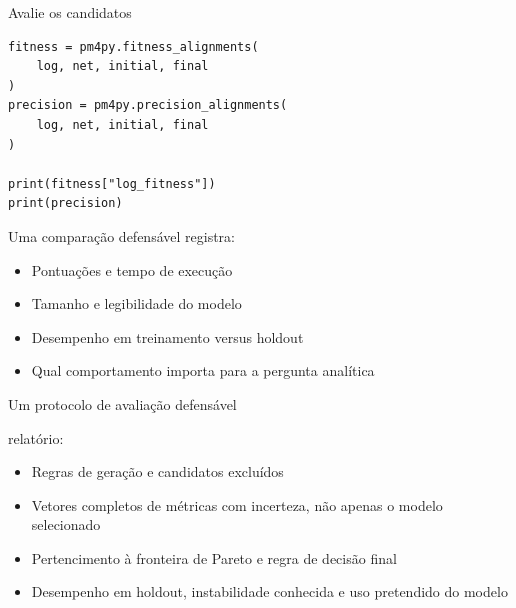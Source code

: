 \documentclass[aspectratio=169,11pt]{beamer}
\begin{document}
\begin{frame}[fragile]{Avalie os candidatos}
\begin{lstlisting}[style=python]
fitness = pm4py.fitness_alignments(
    log, net, initial, final
)
precision = pm4py.precision_alignments(
    log, net, initial, final
)

print(fitness["log_fitness"])
print(precision)
\end{lstlisting}
  \vspace{0.2cm}
  Uma comparação defensável registra:
  \begin{itemize}
    \item Pontuações e tempo de execução
    \item Tamanho e legibilidade do modelo
    \item Desempenho em treinamento versus holdout
    \item Qual comportamento importa para a pergunta analítica
  \end{itemize}
\end{frame}

\begin{frame}{Um protocolo de avaliação defensável}
  \centering
  \vspace{0.55cm}
  relatório:
  \begin{itemize}
    \item Regras de geração e candidatos excluídos
    \item Vetores completos de métricas com incerteza, não apenas o modelo selecionado
    \item Pertencimento à fronteira de Pareto e regra de decisão final
    \item Desempenho em holdout, instabilidade conhecida e uso pretendido do modelo
  \end{itemize}
\end{frame}
\end{document}

